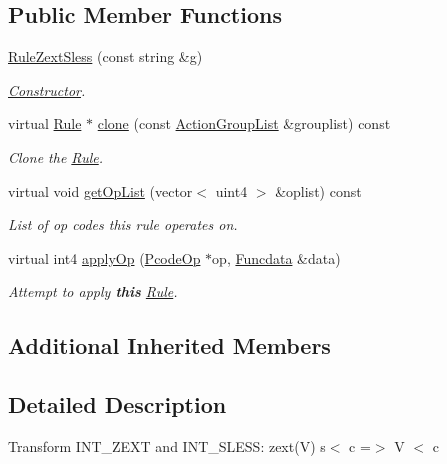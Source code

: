 \subsection*{Public Member Functions}
\begin{DoxyCompactItemize}
\item 
\mbox{\hyperlink{class_rule_zext_sless_a5b64efd401e4aca37f02540481464c89}{Rule\+Zext\+Sless}} (const string \&g)
\begin{DoxyCompactList}\small\item\em \mbox{\hyperlink{class_constructor}{Constructor}}. \end{DoxyCompactList}\item 
virtual \mbox{\hyperlink{class_rule}{Rule}} $\ast$ \mbox{\hyperlink{class_rule_zext_sless_aa1da647b42694b95d5caa0764a1964db}{clone}} (const \mbox{\hyperlink{class_action_group_list}{Action\+Group\+List}} \&grouplist) const
\begin{DoxyCompactList}\small\item\em Clone the \mbox{\hyperlink{class_rule}{Rule}}. \end{DoxyCompactList}\item 
virtual void \mbox{\hyperlink{class_rule_zext_sless_a85d8abc02cf9fa6109872b464e1a1da0}{get\+Op\+List}} (vector$<$ uint4 $>$ \&oplist) const
\begin{DoxyCompactList}\small\item\em List of op codes this rule operates on. \end{DoxyCompactList}\item 
virtual int4 \mbox{\hyperlink{class_rule_zext_sless_ab27ad1b45b037db695c660850954f04e}{apply\+Op}} (\mbox{\hyperlink{class_pcode_op}{Pcode\+Op}} $\ast$op, \mbox{\hyperlink{class_funcdata}{Funcdata}} \&data)
\begin{DoxyCompactList}\small\item\em Attempt to apply {\bfseries{this}} \mbox{\hyperlink{class_rule}{Rule}}. \end{DoxyCompactList}\end{DoxyCompactItemize}
\subsection*{Additional Inherited Members}


\subsection{Detailed Description}
Transform I\+N\+T\+\_\+\+Z\+E\+XT and I\+N\+T\+\_\+\+S\+L\+E\+SS\+: {\ttfamily zext(\+V) s$<$ c =$>$ V $<$ c} 

